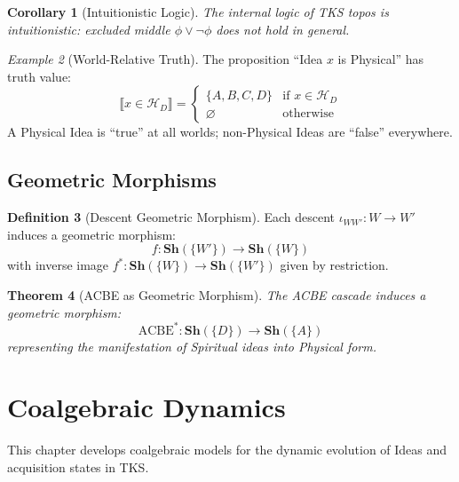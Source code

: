 \documentclass[11pt,twoside,openright]{book}
\theoremstyle{definition}
\newtheorem{definition}{Definition}[chapter]
\theoremstyle{plain}
\newtheorem{theorem}[definition]{Theorem}
\newtheorem{corollary}[definition]{Corollary}
\theoremstyle{remark}
\newtheorem{example}[definition]{Example}
\newcommand{\Hspace}{\mathcal{H}}
\newcommand{\Sh}{\mathbf{Sh}}                %
\newcommand{\vnewtwo}{\textbf{v7.2 New}}
\begin{document}
\begin{corollary}[Intuitionistic Logic]
\label{cor:intuitionistic}
The internal logic of TKS topos is intuitionistic: excluded middle $\phi \lor \neg\phi$ does not hold in general.
\end{corollary}

\begin{example}[World-Relative Truth]
\label{ex:world-relative}
The proposition ``Idea $x$ is Physical'' has truth value:
\[
\llbracket x \in \Hspace_D \rrbracket = \begin{cases}
\{A,B,C,D\} & \text{if } x \in \Hspace_D \\
\varnothing & \text{otherwise}
\end{cases}
\]
A Physical Idea is ``true'' at all worlds; non-Physical Ideas are ``false'' everywhere.
\end{example}

\section{Geometric Morphisms}

\begin{definition}[Descent Geometric Morphism]
\label{def:descent-geom}
Each descent $\iota_{WW'} : W \to W'$ induces a geometric morphism:
\[
f : \Sh(\{W'\}) \to \Sh(\{W\})
\]
with inverse image $f^* : \Sh(\{W\}) \to \Sh(\{W'\})$ given by restriction.
\end{definition}

\begin{theorem}[ACBE as Geometric Morphism]
\label{thm:acbe-geom}
The ACBE cascade induces a geometric morphism:
\[
\mathrm{ACBE}^* : \Sh(\{D\}) \to \Sh(\{A\})
\]
representing the manifestation of Spiritual ideas into Physical form.
\end{theorem}


\chapter{Coalgebraic Dynamics}
\label{ch:coalgebra}

\begin{tcolorbox}[colback=blue!5!white,colframe=blue!75!black,title=\vnewtwo]
This chapter develops coalgebraic models for the dynamic evolution of Ideas and acquisition states in TKS.
\end{tcolorbox}
\end{document}
